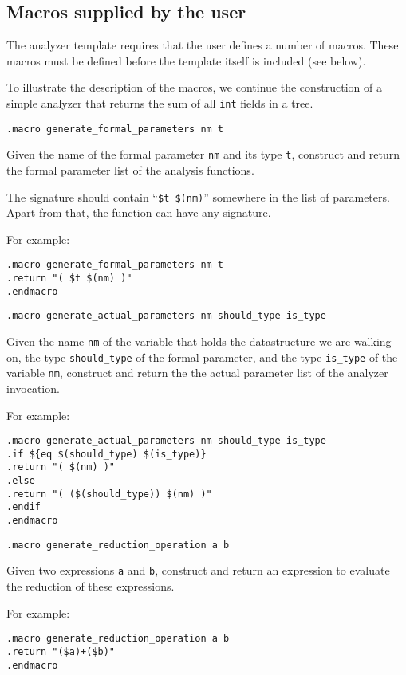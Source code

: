 \subsection{Macros supplied by the user}
The analyzer template requires that the user defines a number of macros.
These macros must be defined before the template itself is included
(see below).
\par
To illustrate the description of the macros, we continue the
construction of a simple analyzer
that returns the sum of all {\tt int} fields in a tree.
\begin{verbatim}
.macro generate_formal_parameters nm t
\end{verbatim}
\begin{desc}
Given the name of the formal parameter {\tt nm} and its type {\tt t},
construct and return the formal parameter list of the analysis functions.

The signature should contain ``\verb'$t $(nm)''' somewhere in the list
of parameters. Apart from that, the function can have any signature.
\par
For example:
\begin{verbatim}
.macro generate_formal_parameters nm t
.return "( $t $(nm) )"
.endmacro
\end{verbatim}
\end{desc}
\begin{verbatim}
.macro generate_actual_parameters nm should_type is_type
\end{verbatim}
\begin{desc}
Given the name \verb'nm' of the variable that holds the datastructure
we are walking on, the type \verb'should_type' of the formal parameter,
and the type \verb'is_type' of the variable {\tt nm}, construct and
return the the actual parameter list of the analyzer invocation.
\par
For example:
\begin{verbatim}
.macro generate_actual_parameters nm should_type is_type
.if ${eq $(should_type) $(is_type)}
.return "( $(nm) )"
.else
.return "( ($(should_type)) $(nm) )"
.endif
.endmacro
\end{verbatim}
\end{desc}
\begin{verbatim}
.macro generate_reduction_operation a b
\end{verbatim}
\begin{desc}
Given two expressions {\tt a} and {\tt b}, construct and return an expression
to evaluate the reduction of these expressions.
\par
For example:
\begin{verbatim}
.macro generate_reduction_operation a b
.return "($a)+($b)"
.endmacro
\end{verbatim}
\end{desc}
